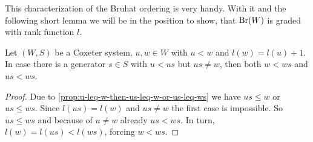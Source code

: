 This characterization of the Bruhat ordering is very handy. With it and the following short lemma we will be in the position to show, that $\operatorname{Br}(W)$ is graded with rank function $l$.

\begin{lemm}
	Let $(W,S)$ be a Coxeter system, $u,w \in W$ with $u < w$ and $l(w) = l(u) + 1$. In case there is a generator $s \in S$ with $u < us$ but $us \neq w$, then both $w < ws$ and $us < ws$.

	\begin{proof}
		Due to \ref{prop:u-leq-w-then-us-leq-w-or-us-leq-ws} we have $us \leq w$ or $us \leq ws$. Since $l(us) = l(w)$ and $us \neq w$ the first case is impossible. So $us \leq ws$ and because of $u \neq w$ already $us < ws$. In turn, $l(w) = l(us) < l(ws)$, forcing $w < ws$.
	\end{proof}
\end{lemm}

